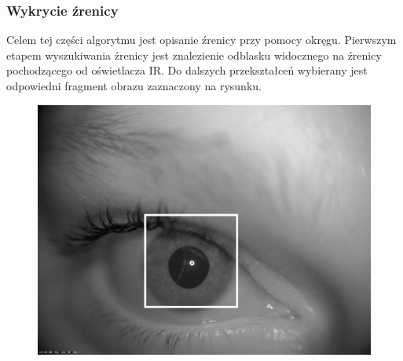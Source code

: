 \documentclass{beamer}
\begin{document}

\begin{frame}
\frametitle{Wykrycie źrenicy}
Celem tej części algorytmu jest opisanie źrenicy przy pomocy okręgu. Pierwszym etapem wyszukiwania źrenicy jest znalezienie odblasku widocznego na źrenicy pochodzącego od oświetlacza IR. Do dalszych przekształceń wybierany jest odpowiedni fragment obrazu zaznaczony na rysunku.
\begin{figure}
\begin{center}
\includegraphics[scale=0.07]{obszar.jpg}
\end{center}
\end{figure}
\end{frame}

\end{document}
